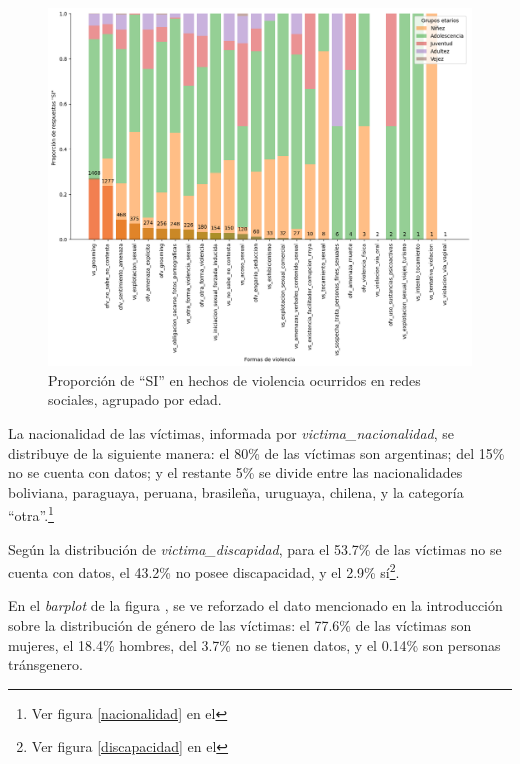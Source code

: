 \documentclass[10 pt]{article}
\begin{document}
\begin{figure}[H]
    \begin{center}
    \includegraphics[scale=.5]{images/latex_redes_sociales_edad_formas_violencia.png}
    \caption{Proporción de “SI” en hechos de violencia ocurridos en redes sociales, agrupado por edad.}
    \label{redes}
    \end{center}
    \end{figure}


La nacionalidad de las víctimas, informada por \textit{victima\_nacionalidad}, se distribuye de la siguiente manera: el 80\% de las víctimas son argentinas; del 15\% no se cuenta con datos; y el restante 5\% se divide entre las nacionalidades boliviana, paraguaya, peruana, brasileña, uruguaya, chilena, y la categoría “otra”.\footnote{Ver figura \ref{nacionalidad} en el 
}


Según la distribución de \textit{victima\_discapidad}, para el 53.7\% de las víctimas no se cuenta con datos, el 43.2\% no posee discapacidad, y el 2.9\% sí\footnote{Ver figura \ref{discapacidad} en el }. 


En el \textit{barplot} de la figura , se ve reforzado el dato mencionado en la introducción sobre la distribución de género de las víctimas: el 77.6\% de las víctimas son mujeres, el 18.4\% hombres, del 3.7\% no se tienen datos, y el 0.14\% son personas tránsgenero. 
\end{document}
